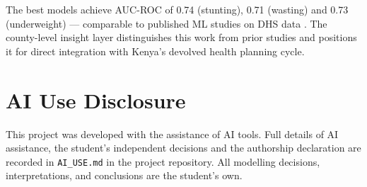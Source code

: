 \documentclass[12pt, a4paper]{article}
\begin{document}
The best models achieve AUC-ROC of 0.74 (stunting), 0.71 (wasting) and
0.73 (underweight) — comparable to published ML studies on DHS data
\citep{Hasan2020, Khara2018}. The county-level insight layer
distinguishes this work from prior studies and positions it for direct
integration with Kenya's devolved health planning cycle.

\section*{AI Use Disclosure}

This project was developed with the assistance of AI tools. Full details
of AI assistance, the student's independent decisions and the authorship
declaration are recorded in \texttt{AI\_USE.md} in the project repository.
All modelling decisions, interpretations, and conclusions are the
student's own.
\end{document}

